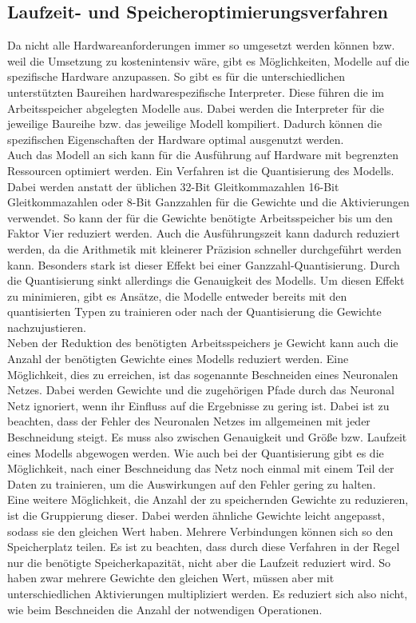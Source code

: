 \subsection{Laufzeit- und Speicheroptimierungsverfahren}\label{subsec:Laufzeit- und Speicheroptimierungsverfahren}
    Da nicht alle Hardwareanforderungen immer so umgesetzt werden können bzw. weil die Umsetzung zu kostenintensiv wäre, gibt es Möglichkeiten, Modelle auf die spezifische Hardware anzupassen. So gibt es für die unterschiedlichen unterstützten Baureihen hardwarespezifische Interpreter. Diese führen die im Arbeitsspeicher abgelegten Modelle aus. Dabei werden die Interpreter für die jeweilige Baureihe bzw. das jeweilige Modell kompiliert. Dadurch können die spezifischen Eigenschaften der Hardware optimal ausgenutzt werden\cite{warden2020tinyml}.\\ Auch das Modell an sich kann für die Ausführung auf Hardware mit begrenzten Ressourcen optimiert werden. Ein Verfahren ist die Quantisierung des Modells. Dabei werden anstatt der üblichen 32-Bit Gleitkommazahlen 16-Bit Gleitkommazahlen oder 8-Bit Ganzzahlen für die Gewichte und die Aktivierungen verwendet. So kann der für die Gewichte benötigte Arbeitsspeicher bis um den Faktor Vier reduziert werden. Auch die Ausführungszeit kann dadurch reduziert werden, da die Arithmetik mit kleinerer Präzision schneller durchgeführt werden kann. Besonders stark ist dieser Effekt bei einer Ganzzahl-Quantisierung. Durch die Quantisierung sinkt allerdings die Genauigkeit des Modells. Um diesen Effekt zu minimieren, gibt es Ansätze, die Modelle entweder bereits mit den quantisierten Typen zu trainieren oder nach der Quantisierung die Gewichte nachzujustieren\cite{Quant}.\\ Neben der Reduktion des benötigten Arbeitsspeichers je Gewicht kann auch die Anzahl der benötigten Gewichte eines Modells reduziert werden. Eine Möglichkeit, dies zu erreichen, ist das sogenannte Beschneiden eines Neuronalen Netzes. Dabei werden Gewichte und die zugehörigen Pfade durch das Neuronal Netz ignoriert, wenn ihr Einfluss auf die Ergebnisse zu gering ist. Dabei ist zu beachten, dass der Fehler des Neuronalen Netzes im allgemeinen mit jeder Beschneidung steigt. Es muss also zwischen Genauigkeit und Größe bzw. Laufzeit eines Modells abgewogen werden. Wie auch bei der Quantisierung gibt es die Möglichkeit, nach einer Beschneidung das Netz noch einmal mit einem Teil der Daten zu trainieren, um die Auswirkungen auf den Fehler gering zu halten\cite{Prune}.\\ Eine weitere Möglichkeit, die Anzahl der zu speichernden Gewichte zu reduzieren, ist die Gruppierung dieser. Dabei werden ähnliche Gewichte leicht angepasst, sodass sie den gleichen Wert haben. Mehrere Verbindungen können sich so den Speicherplatz teilen. Es ist zu beachten, dass durch diese Verfahren in der Regel nur die benötigte Speicherkapazität, nicht aber die Laufzeit reduziert wird. So haben zwar mehrere Gewichte den gleichen Wert, müssen aber mit unterschiedlichen Aktivierungen multipliziert werden. Es reduziert sich also nicht, wie beim Beschneiden die Anzahl der notwendigen Operationen\cite{Ye2022}.  

